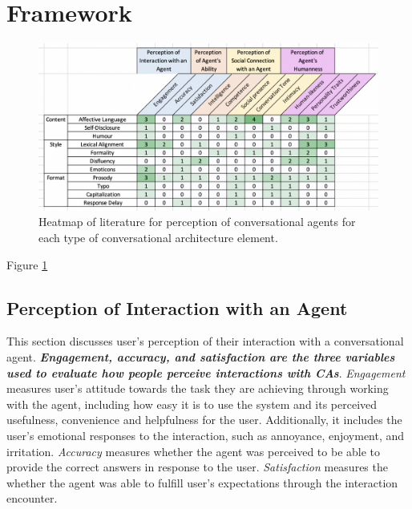 \documentclass[sigconf,screen,review, anonymous]{acmart}
\begin{document}
\section{Framework}

\begin{figure}[h]
  \centering
  \includegraphics[width=\textwidth]{heatmap.png}
  \caption{Heatmap of literature for perception of conversational agents for each type of conversational architecture element.}
  \label{fig:heatmap}
\end{figure}

Figure \ref{fig:heatmap}


\subsection{Perception of Interaction with an Agent}

This section discusses user's perception of their interaction with a conversational agent. \textbf{\textit{Engagement, accuracy, and satisfaction are the three variables used to evaluate how people perceive interactions with CAs}}. \textit{Engagement} measures user's attitude towards the task they are achieving through working with the agent, including how easy it is to use the system and its perceived usefulness, convenience and helpfulness for the user. Additionally, it includes the user's emotional responses to the interaction, such as annoyance, enjoyment, and irritation. \textit{Accuracy} measures whether the agent was perceived to be able to provide the correct answers in response to the user. \textit{Satisfaction} measures the whether the agent was able to fulfill user's expectations through the interaction encounter.
\end{document}
